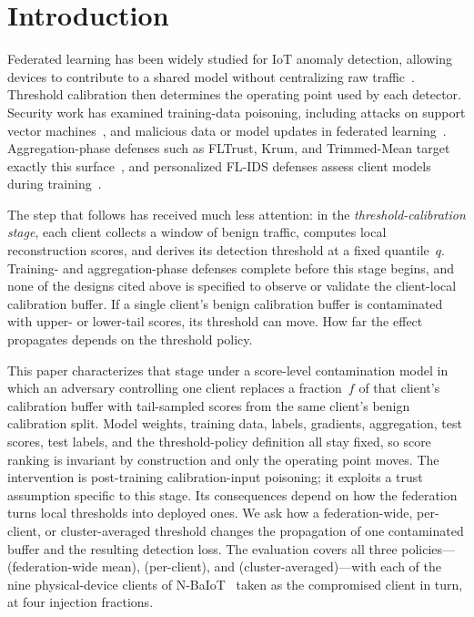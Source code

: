 \section{Introduction}
\label{sec:intro}

Federated learning has been widely studied for IoT anomaly detection, allowing devices to contribute to a shared model without centralizing raw traffic~\cite{rey2022federated,bunko2026ppflids}. Threshold calibration then determines the operating point used by each detector.
Security work has examined training-data poisoning, including attacks on support vector machines~\cite{biggio2012poisoning,biggio2018wild}, and malicious data or model updates in federated learning~\cite{wan2024poisoning,tolpegin2020data}.
Aggregation-phase defenses such as FLTrust, Krum, and Trimmed-Mean target exactly this surface~\cite{feng2025security,cao2020fltrust,blanchard2017krum,yin2018trimmed,kairouz2021advances}, and personalized FL-IDS defenses assess client models during training~\cite{Thein2024PFLIDS}.

The step that follows has received much less attention: in the \emph{threshold-calibration stage}, each client collects a window of benign traffic, computes local reconstruction scores, and derives its detection threshold at a fixed quantile~$q$.
Training- and aggregation-phase defenses complete before this stage begins, and none of the designs cited above is specified to observe or validate the client-local calibration buffer.
If a single client's benign calibration buffer is contaminated with upper- or lower-tail scores, its threshold can move. How far the effect propagates depends on the threshold policy.

This paper characterizes that stage under a score-level contamination model in which an adversary controlling one client replaces a fraction~$f$ of that client's calibration buffer with tail-sampled scores from the same client's benign calibration split.
Model weights, training data, labels, gradients, aggregation, test scores, test labels, and the threshold-policy definition all stay fixed, so score ranking is invariant by construction and only the operating point moves.
The intervention is post-training calibration-input poisoning; it exploits a trust assumption specific to this stage.
Its consequences depend on how the federation turns local thresholds into deployed ones.
We ask how a federation-wide, per-client, or cluster-averaged threshold changes the propagation of one contaminated buffer and the resulting detection loss.
The evaluation covers all three policies---\GLOBAL (federation-wide mean), \LOCAL (per-client), and \CLUSTER (cluster-averaged)---with each of the nine physical-device clients of N-BaIoT~\cite{meidan2018nbaiot} taken as the compromised client in turn, at four injection fractions.


